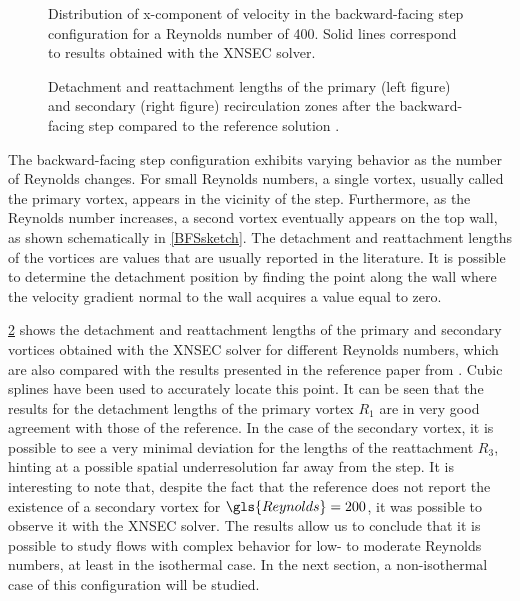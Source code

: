 \begin{figure}[bt]
	\centering
	\caption[Distribution of x-component of velocity in the backward-facing step configuration for a Reynolds number of 400.]{Distribution of x-component of velocity in the backward-facing step configuration for a Reynolds number of 400. Solid lines correspond to results obtained with the XNSEC solver.}
	\label{fig:uvelBFS}
\end{figure}



\begin{figure}[tb]
	\centering
	\caption[Detachment and reattachment lengths of the primary and secondary recirculation zones after the backward-facing step compared to the reference solution]{ Detachment and reattachment lengths of the primary (left figure) and secondary (right figure) recirculation zones after the backward-facing step compared to the reference solution \parencite{biswasBackwardFacingStepFlows2004}.}
	\label{fig:Re_De_Attachmentlengths}
\end{figure}
The backward-facing step configuration exhibits varying behavior as the number of Reynolds changes. For small Reynolds numbers, a single vortex, usually called the primary vortex, appears in the vicinity of the step. Furthermore, as the Reynolds number increases, a second vortex eventually appears on the top wall, as shown schematically in \cref{BFSsketch}.
The detachment and reattachment lengths of the vortices are values that are usually reported in the literature. It is possible to determine the detachment position by finding the point along the wall where the velocity gradient normal to the wall acquires a value equal to zero. 

\cref{fig:Re_De_Attachmentlengths} shows the detachment and reattachment lengths of the primary and secondary vortices obtained with the XNSEC solver for different Reynolds numbers, which are also compared with the results presented in the reference paper from \textcite{biswasBackwardFacingStepFlows2004}. Cubic splines have been used to accurately locate this point. It can be seen that the results for the detachment lengths of the primary vortex $R_1$ are in very good agreement with those of the reference. In the case of the secondary vortex, it is possible to see a very minimal deviation for the lengths of the reattachment $R_3$, hinting at a possible spatial underresolution far away from the step. It is interesting to note that, despite the fact that the reference does not report the existence of a secondary vortex for $\gls{Reynolds} = 200$, it was possible to observe it with the XNSEC solver. The results allow us to conclude that it is possible to study flows with complex behavior for low- to moderate Reynolds numbers, at least in the isothermal case. In the next section, a non-isothermal case of this configuration will be studied.

